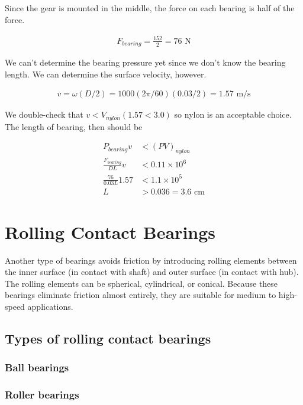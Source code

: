 \documentclass[a4paper,openany]{tufte-book}
\begin{document}
Since the gear is mounted in the middle, the force on each bearing is half of the force.

\begin{align*}
    F_{bearing} = \frac{152}{2} = 76 \text{ N}
\end{align*}

We can't determine the bearing pressure yet since we don't know the bearing length. We can determine the surface velocity, however.

\begin{align*}
    v = \omega (D/2) = 1000 (2\pi / 60) (0.03/2) = 1.57 \text{ m/s}
\end{align*}

We double-check that \(v < V_{nylon} (1.57 < 3.0)\) so nylon is an
acceptable choice. The length of bearing, then should be

\begin{align*}
  P_{bearing}v &< (PV)_{nylon} \\
  \frac{F_{bearing}}{DL}v &< 0.11 \times 10^6 \\
  \frac{76}{0.03L} 1.57 &< 1.1 \times 10^5 \\
  L &> 0.036 = 3.6 \text{ cm}
\end{align*}

\chapter{Rolling Contact Bearings}
\label{sec:orged92f79}

Another type of bearings avoids friction by introducing rolling elements between the inner surface (in contact with shaft) and outer surface (in contact with hub). The rolling elements can be spherical, cylindrical, or conical. Because these bearings eliminate friction almost entirely, they are suitable for medium to high-speed applications.

\section{Types of rolling contact bearings}
\label{sec:org5621186}

\subsection{Ball bearings}
\label{sec:org5d56434}

\subsection{Roller bearings}
\label{sec:org0ba3fc9}
\end{document}
